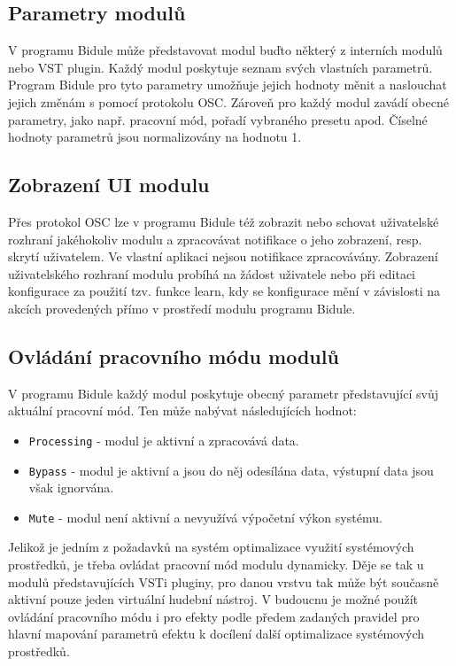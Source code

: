 \documentclass[thesis=M,czech]{FITthesis}[2019/03/06]
\begin{document}
	\subsection{Parametry modulů}
	V programu Bidule může představovat modul buďto některý z interních modulů nebo VST plugin. Každý modul poskytuje seznam svých vlastních parametrů.
	Program Bidule pro tyto parametry umožňuje jejich hodnoty měnit a naslouchat jejich změnám s pomocí protokolu OSC.
	Zároveň pro každý modul zavádí obecné parametry, jako např. pracovní mód, pořadí vybraného presetu apod.
	Číselné hodnoty parametrů jsou normalizovány na hodnotu 1.
	
	\subsection{Zobrazení UI modulu}
	Přes protokol OSC lze v programu Bidule též zobrazit nebo schovat uživatelské rozhraní jakéhokoliv modulu a zpracovávat notifikace
	o jeho zobrazení, resp. skrytí uživatelem. Ve vlastní aplikaci nejsou notifikace zpracovávány. Zobrazení uživatelského rozhraní modulu
	probíhá na žádost uživatele nebo při editaci konfigurace za použití tzv. funkce learn, kdy se konfigurace mění v závislosti
	na akcích provedených přímo v prostředí modulu programu Bidule.
	
	\subsection{Ovládání pracovního módu modulů}
	V programu Bidule každý modul poskytuje obecný parametr představující svůj aktuální pracovní mód. Ten může nabývat následujících hodnot:
	\begin{itemize}
		\item \texttt{Processing} - modul je aktivní a zpracovává data.
		\item \texttt{Bypass} - modul je aktivní a jsou do něj odesílána data, výstupní data jsou však ignorvána.
		\item \texttt{Mute} - modul není aktivní a nevyužívá výpočetní výkon systému.
	\end{itemize}
	Jelikož je jedním z požadavků na systém optimalizace využití systémových prostředků, je třeba ovládat
	pracovní mód modulu dynamicky. Děje se tak u modulů představujících VSTi pluginy, pro danou vrstvu 
	tak může být současně aktivní pouze jeden virtuální hudební nástroj. V budoucnu je možné použít ovládání pracovního módu
	i pro efekty podle předem zadaných pravidel pro hlavní mapování parametrů efektu k docílení další optimalizace
	systémových prostředků.
	
\end{document}
